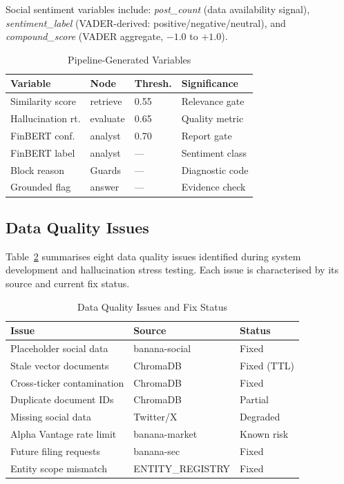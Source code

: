 \documentclass[10pt,journal,compsoc]{IEEEtran}
\begin{document}
Social sentiment variables include: \textit{post\_count}
(data availability signal), \textit{sentiment\_label}
(VADER-derived: positive/negative/neutral), and
\textit{compound\_score} (VADER aggregate, $-1.0$ to $+1.0$).

\begin{table}[htbp]
\caption{Pipeline-Generated Variables}
\label{tab:pipevar}
\centering
\small
\begin{tabular}{@{}llll@{}}
\toprule
\textbf{Variable} & \textbf{Node} & \textbf{Thresh.} &
\textbf{Significance} \\
\midrule
Similarity score  & retrieve  & 0.55 & Relevance gate \\
Hallucination rt. & evaluate  & 0.65 & Quality metric \\
FinBERT conf.     & analyst   & 0.70 & Report gate \\
FinBERT label     & analyst   & ---  & Sentiment class \\
Block reason      & Guards    & ---  & Diagnostic code \\
Grounded flag     & answer    & ---  & Evidence check \\
\bottomrule
\end{tabular}
\end{table}

\subsection{Data Quality Issues}

Table~\ref{tab:dataqual} summarises eight data quality issues
identified during system development and hallucination stress testing.
Each issue is characterised by its source and current fix status.

\begin{table}[htbp]
\caption{Data Quality Issues and Fix Status}
\label{tab:dataqual}
\centering
\small
\begin{tabular}{@{}lll@{}}
\toprule
\textbf{Issue} & \textbf{Source} & \textbf{Status} \\
\midrule
Placeholder social data     & banana-social       & Fixed \\
Stale vector documents      & ChromaDB            & Fixed (TTL) \\
Cross-ticker contamination  & ChromaDB            & Fixed \\
Duplicate document IDs      & ChromaDB            & Partial \\
Missing social data         & Twitter/X           & Degraded \\
Alpha Vantage rate limit    & banana-market       & Known risk \\
Future filing requests      & banana-sec          & Fixed \\
Entity scope mismatch       & ENTITY\_REGISTRY    & Fixed \\
\bottomrule
\end{tabular}
\end{table}
\end{document}
